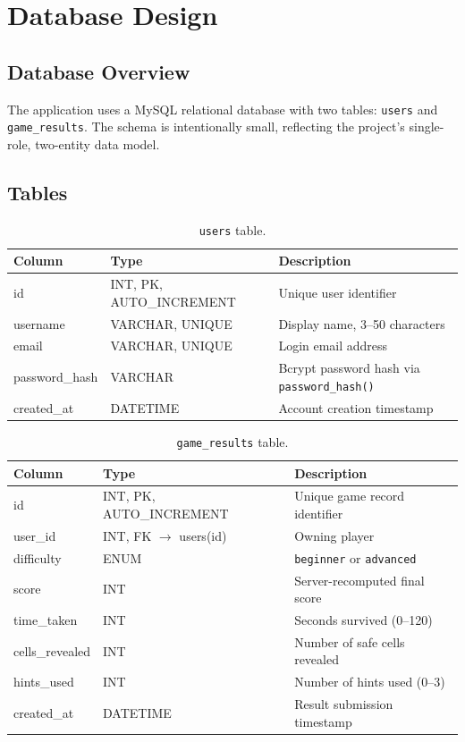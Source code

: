 \chapter{Database Design}
\label{ch:database}

\section{Database Overview}
The application uses a MySQL relational database with two tables:
\texttt{users} and \texttt{game\_results}. The schema is intentionally
small, reflecting the project's single-role, two-entity data model.

\section{Tables}

\begin{table}[h]
\centering
\caption{\texttt{users} table.}
\label{tab:users-table}
\begin{tabular}{@{}p{2.6cm}p{3.4cm}p{7.5cm}@{}}
\toprule
\textbf{Column} & \textbf{Type} & \textbf{Description} \\
\midrule
id & INT, PK, AUTO\_INCREMENT & Unique user identifier \\
username & VARCHAR, UNIQUE & Display name, 3--50 characters \\
email & VARCHAR, UNIQUE & Login email address \\
password\_hash & VARCHAR & Bcrypt password hash via \texttt{password\_hash()} \\
created\_at & DATETIME & Account creation timestamp \\
\bottomrule
\end{tabular}
\end{table}

\begin{table}[h]
\centering
\caption{\texttt{game\_results} table.}
\label{tab:results-table}
\begin{tabular}{@{}p{3cm}p{3.4cm}p{7cm}@{}}
\toprule
\textbf{Column} & \textbf{Type} & \textbf{Description} \\
\midrule
id & INT, PK, AUTO\_INCREMENT & Unique game record identifier \\
user\_id & INT, FK $\to$ users(id) & Owning player \\
difficulty & ENUM & \texttt{beginner} or \texttt{advanced} \\
score & INT & Server-recomputed final score \\
time\_taken & INT & Seconds survived (0--120) \\
cells\_revealed & INT & Number of safe cells revealed \\
hints\_used & INT & Number of hints used (0--3) \\
created\_at & DATETIME & Result submission timestamp \\
\bottomrule
\end{tabular}
\end{table}

